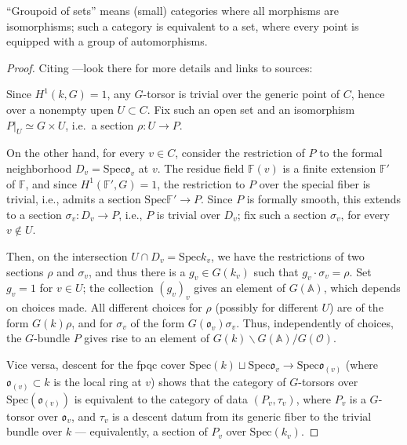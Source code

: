``Groupoid of sets'' means (small) categories where all morphisms are isomorphisms; such a category is equivalent to a set, where every point is equipped with a group of automorphisms.


\begin{proof}
Citing \cite[112593]{Mathoverflow}---look there for more details and links to sources:

Since $H^1(k,G)=1$, any $G$-torsor is trivial over the generic point of $C$, hence over a nonempty upen $U\subset C$. Fix such an open set and an isomorphism $P|_{U} \simeq G\times U$, i.e.\ a section $\rho: U \to P$. 

On the other hand, for every $v\in C$, consider the restriction of $P$ to the formal neighborhood $D_v = \text{Spec} \mathfrak o_v$ at $v$. The residue field $\mathbb F(v)$ is a finite extension $\mathbb F'$ of $\mathbb F$, and since $H^1(\mathbb F',G)=1$, the restriction to $P$ over the special fiber is trivial, i.e., admits a section $\text{Spec} \mathbb F' \to P$. Since $P$ is formally smooth, this extends to a section $\sigma_v: D_v \to P$, i.e., $P$ is trivial over $D_v$; fix such a section $\sigma_v$, for every $v \notin U$. 
 
Then, on the intersection $U\cap D_v = \text{Spec} k_v$, we have the restrictions of two sections $\rho$ and $\sigma_v$, and thus there is a $g_v\in G(k_v)$ such that $g_v\cdot \sigma_v = \rho$. Set $g_v=1$ for $v\in U$; the collection $(g_v)_v$ gives an element of $G(\mathbb A)$, which depends on choices made. All different choices for $\rho$ (possibly for different $U$) are of the form $G(k)\rho$, and for $\sigma_v$ of the form $G(\mathfrak o_v) \sigma_v$. Thus, independently of choices, the $G$-bundle $P$ gives rise to an element of $G(k)\backslash G(\mathbb A)/G(\mathcal O)$.

Vice versa, descent for the fpqc cover $\text{Spec}(k) \sqcup \text{Spec} \mathfrak o_v \to \text{Spec} \mathfrak o_{(v)}$ (where $\mathfrak o_{(v)}\subset k$ is the local ring at $v$) shows that the category of $G$-torsors over $\text{Spec}(\mathfrak o_{(v)})$ is equivalent to the category of data $(P_v, \tau_v)$, where $P_v$ is a $G$-torsor over $\mathfrak o_v$, and $\tau_v$ is a descent datum from its generic fiber to the trivial bundle over $k$ --- equivalently, a section of $P_v$ over $\text{Spec}(k_v)$. 


\end{proof}
